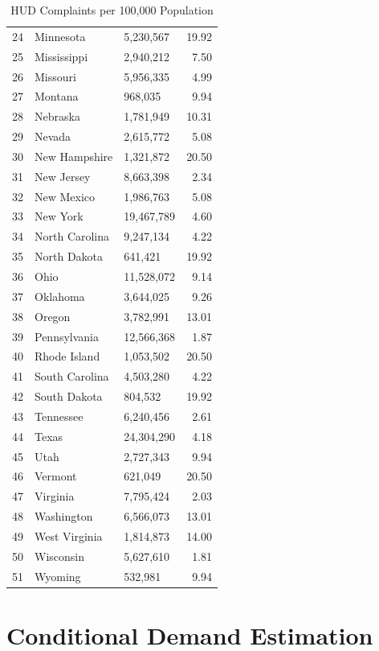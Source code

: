 \documentclass{article}
\begin{document}
\begin{table}[ht]
\begin{tabular}{rllr}
  24 & Minnesota & 5,230,567 & 19.92 \\ 
  25 & Mississippi & 2,940,212 & 7.50 \\ 
  26 & Missouri & 5,956,335 & 4.99 \\ 
  27 & Montana & 968,035 & 9.94 \\ 
  28 & Nebraska & 1,781,949 & 10.31 \\ 
  29 & Nevada & 2,615,772 & 5.08 \\ 
  30 & New Hampshire & 1,321,872 & 20.50 \\ 
  31 & New Jersey & 8,663,398 & 2.34 \\ 
  32 & New Mexico & 1,986,763 & 5.08 \\ 
  33 & New York & 19,467,789 & 4.60 \\ 
  34 & North Carolina & 9,247,134 & 4.22 \\ 
  35 & North Dakota & 641,421 & 19.92 \\ 
  36 & Ohio & 11,528,072 & 9.14 \\ 
  37 & Oklahoma & 3,644,025 & 9.26 \\ 
  38 & Oregon & 3,782,991 & 13.01 \\ 
  39 & Pennsylvania & 12,566,368 & 1.87 \\ 
  40 & Rhode Island & 1,053,502 & 20.50 \\ 
  41 & South Carolina & 4,503,280 & 4.22 \\ 
  42 & South Dakota & 804,532 & 19.92 \\ 
  43 & Tennessee & 6,240,456 & 2.61 \\ 
  44 & Texas & 24,304,290 & 4.18 \\ 
  45 & Utah & 2,727,343 & 9.94 \\ 
  46 & Vermont & 621,049 & 20.50 \\ 
  47 & Virginia & 7,795,424 & 2.03 \\ 
  48 & Washington & 6,566,073 & 13.01 \\ 
  49 & West Virginia & 1,814,873 & 14.00 \\ 
  50 & Wisconsin & 5,627,610 & 1.81 \\ 
  51 & Wyoming & 532,981 & 9.94 \\ 
   \hline
\end{tabular}
\caption{HUD Complaints per 100,000 Population} 
\label{tab:HUDComplaints}
\end{table}
\section{Conditional Demand Estimation}
\end{document}
